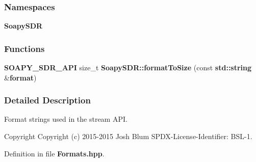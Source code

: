 \subsubsection*{Namespaces}
\begin{DoxyCompactItemize}
\item 
 {\bf Soapy\+S\+DR}
\end{DoxyCompactItemize}
\subsubsection*{Functions}
\begin{DoxyCompactItemize}
\item 
{\bf S\+O\+A\+P\+Y\+\_\+\+S\+D\+R\+\_\+\+A\+PI} size\+\_\+t {\bf Soapy\+S\+D\+R\+::format\+To\+Size} (const {\bf std\+::string} \&{\bf format})
\end{DoxyCompactItemize}


\subsubsection{Detailed Description}
Format strings used in the stream A\+PI. 

\begin{DoxyCopyright}{Copyright}
Copyright (c) 2015-\/2015 Josh Blum S\+P\+D\+X-\/\+License-\/\+Identifier\+: B\+S\+L-\/1. 
\end{DoxyCopyright}


Definition in file {\bf Formats.\+hpp}.

